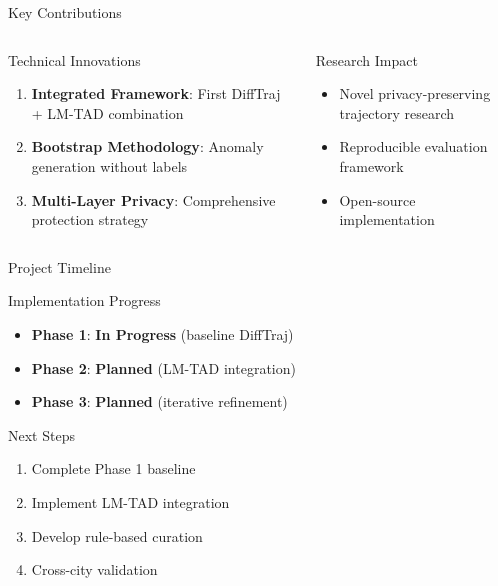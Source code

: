 \documentclass[aspectratio=169,xcolor={dvipsnames}]{beamer}
\newcommand{\phase}[1]{\textcolor{AccentBlue}{\textbf{Phase #1}}}
\begin{document}
\begin{frame}{Key Contributions}
  \begin{columns}
    \begin{column}{0.5\textwidth}
      \begin{block}{Technical Innovations}
        \begin{enumerate}
          \item \textbf{Integrated Framework}: First DiffTraj + LM-TAD combination
          \item \textbf{Bootstrap Methodology}: Anomaly generation without labels
          \item \textbf{Multi-Layer Privacy}: Comprehensive protection strategy
        \end{enumerate}
      \end{block}
    \end{column}
    \begin{column}{0.5\textwidth}
      \begin{block}{Research Impact}
        \begin{itemize}
          \item Novel privacy-preserving trajectory research
          \item Reproducible evaluation framework
          \item Open-source implementation
        \end{itemize}
      \end{block}
    \end{column}
  \end{columns}
\end{frame}

\begin{frame}{Project Timeline}
  \begin{block}{Implementation Progress}
    \begin{itemize}
      \item \phase{1}: \textcolor{VUOrange}{\textbf{In Progress}} (baseline DiffTraj)
      \item \phase{2}: \textbf{Planned} (LM-TAD integration)
      \item \phase{3}: \textbf{Planned} (iterative refinement)
    \end{itemize}
  \end{block}
  
  \vspace{1em}
  \begin{block}{Next Steps}
    \begin{enumerate}
      \item Complete Phase 1 baseline
      \item Implement LM-TAD integration
      \item Develop rule-based curation
      \item Cross-city validation
    \end{enumerate}
  \end{block}
\end{frame}
\end{document}
